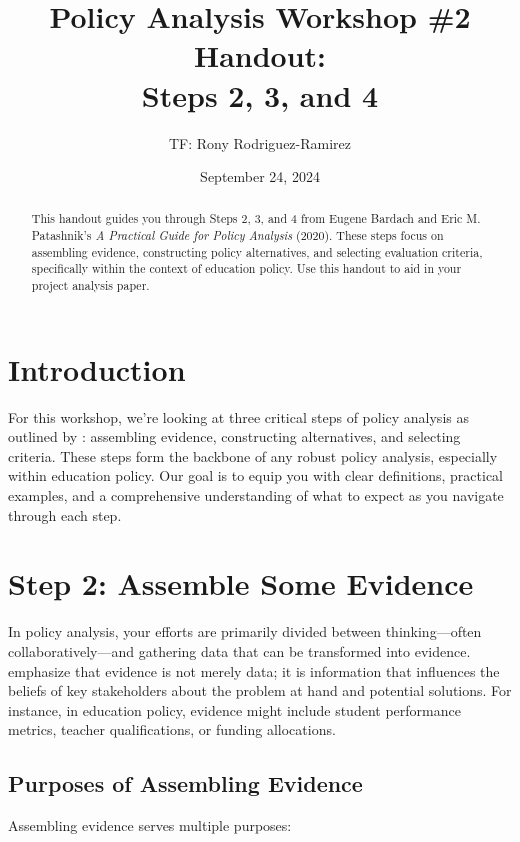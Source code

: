 \documentclass{article}
\title{Policy Analysis Workshop \#2 Handout:\\Steps 2, 3, and 4}
\author{TF: Rony Rodriguez-Ramirez}
\date{September 24, 2024}
\theoremstyle{definition}
\theoremstyle{plain}
\begin{document}
\maketitle

\begin{abstract}
This handout guides you through Steps 2, 3, and 4 from Eugene Bardach and Eric M. Patashnik's \textit{A Practical Guide for Policy Analysis} (2020). These steps focus on assembling evidence, constructing policy alternatives, and selecting evaluation criteria, specifically within the context of education policy. Use this handout to aid in your project analysis paper.
\end{abstract}

\section{Introduction}

For this workshop, we're looking at three critical steps of policy analysis as
outlined by \citet{Bardach2020}: assembling evidence,
constructing alternatives, and selecting criteria. These steps form the backbone
of any robust policy analysis, especially within education policy. Our goal is
to equip you with clear definitions, practical examples, and a comprehensive
understanding of what to expect as you navigate through each step.

\section{Step 2: Assemble Some Evidence}

In policy analysis, your
efforts are primarily divided between thinking—often collaboratively—and
gathering data that can be transformed into evidence. \citet{Bardach2020}
emphasize that evidence is not merely data; it is information that influences
the beliefs of key stakeholders about the problem at hand and potential
solutions. For instance, in education policy, evidence might include student
performance metrics, teacher qualifications, or funding allocations.

\subsection{Purposes of Assembling Evidence}

Assembling evidence serves multiple purposes:
\end{document}
